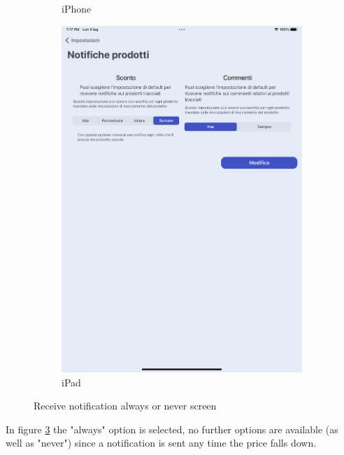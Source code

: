 \begin{figure}[h!]
\begin{subfigure}[b]{0.3\textwidth}
            \caption{iPhone}
            \label{fig:always_never_notification_screen_iphone}
        \end{subfigure}
        \begin{subfigure}[b]{0.45\textwidth}
            \centering
            \includegraphics[width=\textwidth]{images/interfaces/always_never_notification_screen_ipad.png}
            \caption{iPad}
            \label{fig:always_never_notification_screen_ipad}
        \end{subfigure}
         \caption{Receive notification always or never screen}
        \label{fig:always_never_notification_screen}
\end{figure}
\FloatBarrier
In figure \ref{fig:always_never_notification_screen} the "always" option is selected, no further options are available (as well as "never") since a notification is sent any time the price falls down.


